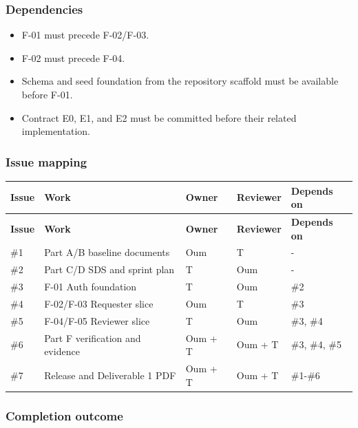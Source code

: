 \documentclass[11pt,a4paper]{article}
\begin{document}
\subsubsection{Dependencies}

\begin{itemize}[leftmargin=*,itemsep=2pt,topsep=2pt]
  \item F-01 must precede F-02/F-03.
  \item F-02 must precede F-04.
  \item Schema and seed foundation from the repository scaffold must be available before F-01.
  \item Contract E0, E1, and E2 must be committed before their related implementation.
\end{itemize}
\subsubsection{Issue mapping}

\vspace{0.3em}
\begin{longtable}{|>{\RaggedRight}p{1.6cm}|>{\RaggedRight}p{3.5cm}|>{\RaggedRight}p{2.5cm}|>{\RaggedRight}p{4.2cm}|>{\RaggedRight}p{4.0cm}|}
\hline
\rowcolor{zenPale}\textbf{Issue} & \textbf{Work} & \textbf{Owner} & \textbf{Reviewer} & \textbf{Depends on} \\ \hline
\endfirsthead
\hline
\rowcolor{zenPale}\textbf{Issue} & \textbf{Work} & \textbf{Owner} & \textbf{Reviewer} & \textbf{Depends on} \\ \hline
\endhead
\hline
\endfoot
\#1 & Part A/B baseline documents & Oum & T & - \\ \hline
\#2 & Part C/D SDS and sprint plan & T & Oum & - \\ \hline
\#3 & F-01 Auth foundation & T & Oum & \#2 \\ \hline
\#4 & F-02/F-03 Requester slice & Oum & T & \#3 \\ \hline
\#5 & F-04/F-05 Reviewer slice & T & Oum & \#3, \#4 \\ \hline
\#6 & Part F verification and evidence & Oum + T & Oum + T & \#3, \#4, \#5 \\ \hline
\#7 & Release and Deliverable 1 PDF & Oum + T & Oum + T & \#1-\#6 \\ \hline
\end{longtable}
\vspace{0.3em}

\subsubsection{Completion outcome}
\end{document}
